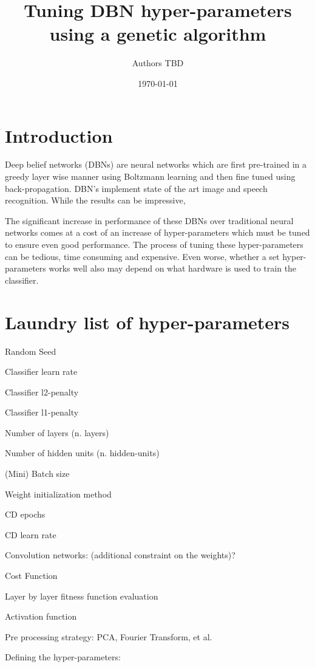 \documentclass[letterpaper,11pt,reqno]{amsart}
\begin{document}
\author{Authors TBD}
\title{Tuning DBN hyper-parameters using a genetic algorithm}
\date{\today}
\maketitle

\section{Introduction}

Deep belief networks (DBNs) are neural networks which are first pre-trained in a greedy layer wise manner using Boltzmann learning and then fine tuned using back-propagation. DBN’s implement state of the art image and speech recognition. While the results can be impressive, 

The significant increase in performance of these DBNs over traditional neural networks comes at a cost of an increase of hyper-parameters which must be tuned to ensure even good performance. The process of tuning these hyper-parameters can be tedious, time consuming and expensive. Even worse, whether a set hyper-parameters works well also may depend on what hardware is used to train the classifier.


\section{Laundry list of hyper-parameters}

Random Seed 

Classifier learn rate 

Classifier l2-penalty 

Classifier l1-penalty 

Number of layers (n. layers) 

Number of hidden units (n. hidden-units) 

(Mini) Batch size 

Weight initialization method 

CD epochs

CD learn rate 

Convolution networks: (additional constraint on the weights)? 

Cost Function

Layer by layer fitness function evaluation

Activation function

Pre processing strategy: PCA, Fourier Transform, et al.  

Defining the hyper-parameters: 
\end{document}
